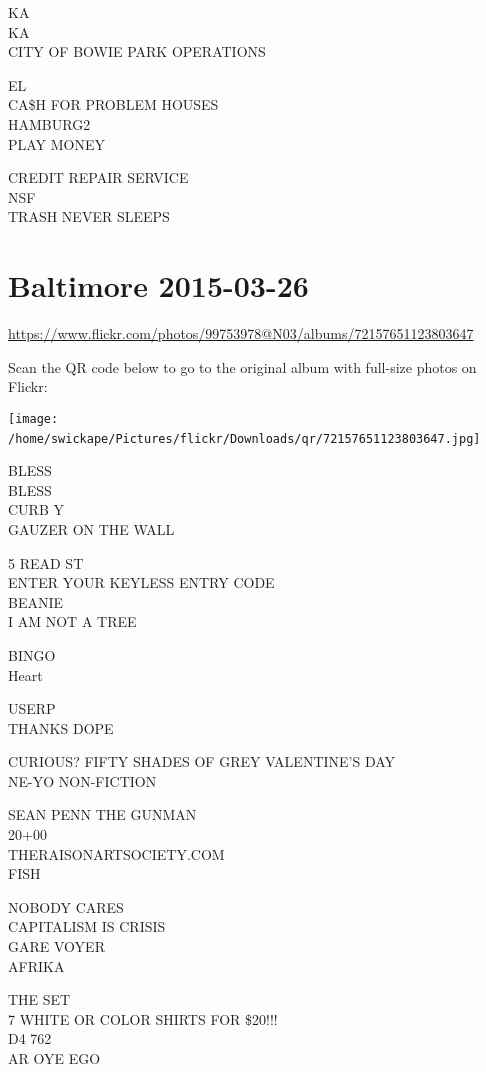 \documentclass[10pt,letterpaper]{article}
\begin{document}
KA\\
KA\\
CITY OF BOWIE PARK OPERATIONS

EL\\
CA\$H FOR PROBLEM HOUSES\\
HAMBURG2\\
PLAY MONEY

CREDIT REPAIR SERVICE\\
NSF\\
TRASH NEVER SLEEPS
\

\section*{Baltimore 2015-03-26}

\url{https://www.flickr.com/photos/99753978@N03/albums/72157651123803647}

Scan the QR code below to go to the original album with full-size photos on Flickr:

\texttt{[image: /home/swickape/Pictures/flickr/Downloads/qr/72157651123803647.jpg]}
\

BLESS\\
BLESS\\
CURB Y\\
GAUZER ON THE WALL

5 READ ST\\
ENTER YOUR KEYLESS ENTRY CODE\\
BEANIE\\
I AM NOT A TREE

BINGO\\
Heart

USERP\\
THANKS DOPE

CURIOUS?  FIFTY SHADES OF GREY VALENTINE'S DAY\\
NE{-}YO NON{-}FICTION

SEAN PENN THE GUNMAN\\
20+00\\
THERAISONARTSOCIETY.COM\\
FISH

NOBODY CARES\\
CAPITALISM IS CRISIS\\
GARE VOYER\\
AFRIKA

THE SET\\
7 WHITE OR COLOR SHIRTS FOR \$20!!!\\
D4 762\\
AR OYE EGO
\end{document}
